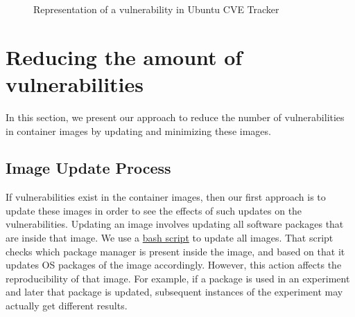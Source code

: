 \documentclass[a4paper,num-refs]{oup-contemporary}
\begin{document}
\begin{figure}[!ht]
        \caption{\label{example} Representation of a vulnerability in Ubuntu CVE Tracker}
\end{figure}
\vspace*{-7mm}
\section{Reducing the amount of vulnerabilities}

In this section, we present our approach to reduce the number of
vulnerabilities in container images  by updating and minimizing these
images.
\vspace*{-2mm}
\subsection{Image Update Process}

If vulnerabilities exist in the container images, then our first approach
is to update these images in order to see the effects of such updates
on the vulnerabilities.
Updating an image involves updating all software packages that are
inside that image. We use a 
\href{https://github.com/kaurbhupinder/Vulnerability-Analysis/blob/master/Scripts/update/update.sh}{bash script} 
to update all images. That script checks which
package manager is present inside the image, and based on that
it updates OS packages of the image
accordingly. However, this action affects the reproducibility
of that image. For example, if a package is used in an experiment
and later that package is updated, subsequent instances of the experiment may actually
get different results.
\vspace*{-2mm}
\end{document}

